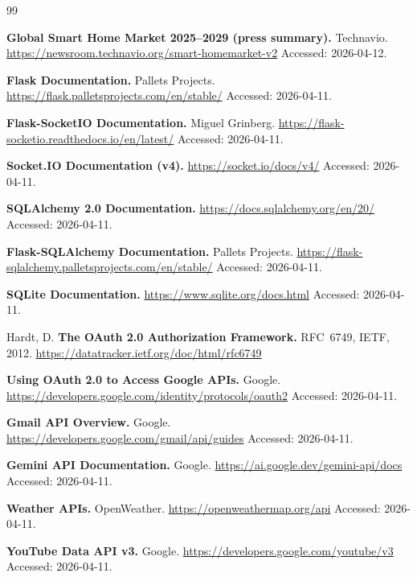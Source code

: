 \documentclass[12pt,a4paper]{report}
\begin{document}
\begin{thebibliography}{99}

\textbf{Global Smart Home Market 2025--2029 (press summary).} Technavio.
\newblock \url{https://newsroom.technavio.org/smart-homemarket-v2}
\newblock Accessed: 2026-04-12.

\textbf{Flask Documentation.} Pallets Projects.
\newblock \url{https://flask.palletsprojects.com/en/stable/}
\newblock Accessed: 2026-04-11.

\textbf{Flask-SocketIO Documentation.} Miguel Grinberg.
\newblock \url{https://flask-socketio.readthedocs.io/en/latest/}
\newblock Accessed: 2026-04-11.

\textbf{Socket.IO Documentation (v4).}
\newblock \url{https://socket.io/docs/v4/}
\newblock Accessed: 2026-04-11.

\textbf{SQLAlchemy 2.0 Documentation.}
\newblock \url{https://docs.sqlalchemy.org/en/20/}
\newblock Accessed: 2026-04-11.

\textbf{Flask-SQLAlchemy Documentation.} Pallets Projects.
\newblock \url{https://flask-sqlalchemy.palletsprojects.com/en/stable/}
\newblock Accessed: 2026-04-11.

\textbf{SQLite Documentation.}
\newblock \url{https://www.sqlite.org/docs.html}
\newblock Accessed: 2026-04-11.

Hardt, D.
\newblock \textbf{The OAuth 2.0 Authorization Framework.} RFC~6749, IETF, 2012.
\newblock \url{https://datatracker.ietf.org/doc/html/rfc6749}

\textbf{Using OAuth 2.0 to Access Google APIs.} Google.
\newblock \url{https://developers.google.com/identity/protocols/oauth2}
\newblock Accessed: 2026-04-11.

\textbf{Gmail API Overview.} Google.
\newblock \url{https://developers.google.com/gmail/api/guides}
\newblock Accessed: 2026-04-11.

\textbf{Gemini API Documentation.} Google.
\newblock \url{https://ai.google.dev/gemini-api/docs}
\newblock Accessed: 2026-04-11.

\textbf{Weather APIs.} OpenWeather.
\newblock \url{https://openweathermap.org/api}
\newblock Accessed: 2026-04-11.

\textbf{YouTube Data API v3.} Google.
\newblock \url{https://developers.google.com/youtube/v3}
\newblock Accessed: 2026-04-11.


\end{thebibliography}
\end{document}

